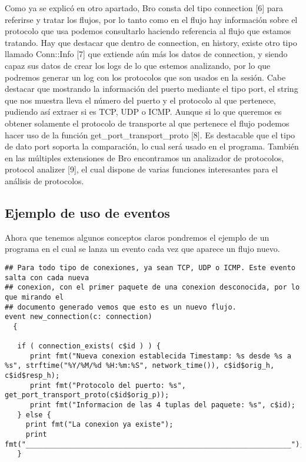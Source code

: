 {{{Como ya se explicó en otro apartado, Bro consta del tipo connection [6] 
para referirse y tratar los flujos, por lo tanto como en el flujo hay 
información sobre el protocolo que usa podemos consultarlo haciendo 
referencia al flujo que estamos tratando. Hay que destacar que dentro 
de connection, en history, existe otro tipo llamado Conn::Info [7] que 
extiende aún más los datos de connection, y siendo capaz sus datos de 
crear los logs de lo que estemos analizando, por lo que podremos generar 
un log con los protocolos que son usados en la sesión. Cabe destacar que 
mostrando la información del puerto mediante el tipo port, el string que 
nos muestra lleva el número del puerto y el protocolo al que pertenece, 
pudiendo así extraer si es TCP, UDP o ICMP. Aunque si lo que queremos es 
obtener solamente el protocolo de transporte al que pertenece el flujo 
podemos hacer uso de la función get_port_transport_proto [8].
\intro
Es destacable que el tipo de dato port soporta la comparación, lo cual 
será usado en el programa.  
\intro
También en las múltiples extensiones de Bro encontramos un analizador 
de protocolos, protocol analizer [9], el cual dispone de varias funciones 
interesantes para el análisis de protocolos.

\subsection{Ejemplo de uso de eventos}

Ahora que tenemos algunos conceptos claros pondremos el ejemplo de un 
programa en el cual se lanza un evento cada vez que aparece un flujo nuevo.
\intro
\pagebreak

\begin{lstlisting}[language=Consola, title=ejemploEvento.bro]
## Para todo tipo de conexiones, ya sean TCP, UDP o ICMP. Este evento salta con cada nueva
## conexion, con el primer paquete de una conexion desconocida, por lo que mirando el
## documento generado vemos que esto es un nuevo flujo.
event new_connection(c: connection)
  {

   if ( connection_exists( c$id ) ) {
      print fmt("Nueva conexion establecida Timestamp: %s desde %s a %s", strftime("%Y/%M/%d %H:%m:%S", network_time()), c$id$orig_h, c$id$resp_h);
      print fmt("Protocolo del puerto: %s", get_port_transport_proto(c$id$orig_p));
      print fmt("Informacion de las 4 tuplas del paquete: %s", c$id);
   } else {
     print fmt("La conexion ya existe");
     print fmt("_______________________________________________________________");
   }


\end{lstlisting}}}}
